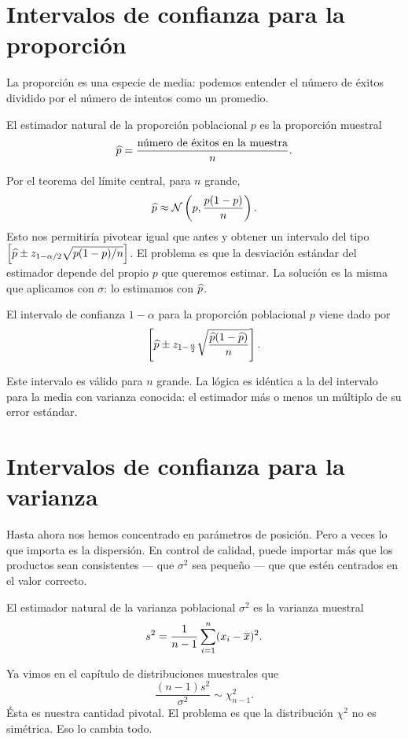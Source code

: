 \section{Intervalos de confianza para la proporción}

La proporción es una especie de media: podemos entender el número de éxitos dividido por el número de intentos como un promedio.

El estimador natural de la proporción poblacional \(p\) es la proporción muestral \[\widehat{p} = \frac{\text{número de éxitos en la muestra}}{n}.\]

Por el teorema del límite central, para \(n\) grande, \[\widehat{p} \approx \operatorname{\mathcal{N}}\left( p, \frac{p(1-p)}{n} \right).\] Esto nos permitiría pivotear igual que antes y obtener un intervalo del tipo \(\left[\widehat{p} \pm z_{1-\alpha/2}\sqrt{p(1-p)/n}\right]\). El problema es que la desviación estándar del estimador depende del propio \(p\) que queremos estimar. La solución es la misma que aplicamos con \(\sigma\): lo estimamos con \(\widehat{p}\).

\begin{definition}
El intervalo de confianza \(1-\alpha\) para la proporción poblacional \(p\) viene dado por \[\left[\widehat{p} \pm z_{1-\frac{\alpha}{2}}\sqrt{\frac{\widehat{p}(1-\widehat{p})}{n}}\right].\]
\end{definition}

Este intervalo es válido para \(n\) grande. La lógica es idéntica a la del intervalo para la media con varianza conocida: el estimador más o menos un múltiplo de su error estándar.

\section{Intervalos de confianza para la varianza}

Hasta ahora nos hemos concentrado en parámetros de posición. Pero a veces lo que importa es la dispersión. En control de calidad, puede importar más que los productos sean consistentes — que \(\sigma^2\) sea pequeño — que que estén centrados en el valor correcto.

El estimador natural de la varianza poblacional \(\sigma^2\) es la varianza muestral \[s^2 = \frac{1}{n-1}\sum_{i=1}^{n}(x_i - \overline{x})^2.\]

Ya vimos en el capítulo de distribuciones muestrales que \[\frac{(n-1)s^2}{\sigma^2} \sim \chi^2_{n-1}.\] Ésta es nuestra cantidad pivotal. El problema es que la distribución \(\chi^2\) no es simétrica. Eso lo cambia todo.

